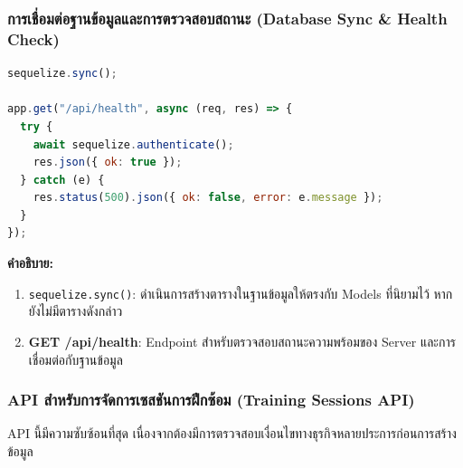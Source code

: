 \subsubsection{การเชื่อมต่อฐานข้อมูลและการตรวจสอบสถานะ (Database Sync \& Health Check)}
\begin{lstlisting}[language=JavaScript, caption={ซอร์สโค้ดจากไฟล์ server.js}, label={code:server-js-health}]
sequelize.sync();

app.get("/api/health", async (req, res) => {
  try {
    await sequelize.authenticate();
    res.json({ ok: true });
  } catch (e) {
    res.status(500).json({ ok: false, error: e.message });
  }
});
\end{lstlisting}
\textbf{คำอธิบาย:}
\begin{enumerate}
    \item \texttt{sequelize.sync()}: ดำเนินการสร้างตารางในฐานข้อมูลให้ตรงกับ Models ที่นิยามไว้ หากยังไม่มีตารางดังกล่าว
    \item \textbf{GET /api/health}: Endpoint สำหรับตรวจสอบสถานะความพร้อมของ Server และการเชื่อมต่อกับฐานข้อมูล
\end{enumerate}

\subsubsection{API สำหรับการจัดการเซสชันการฝึกซ้อม (Training Sessions API)}
API นี้มีความซับซ้อนที่สุด เนื่องจากต้องมีการตรวจสอบเงื่อนไขทางธุรกิจหลายประการก่อนการสร้างข้อมูล

